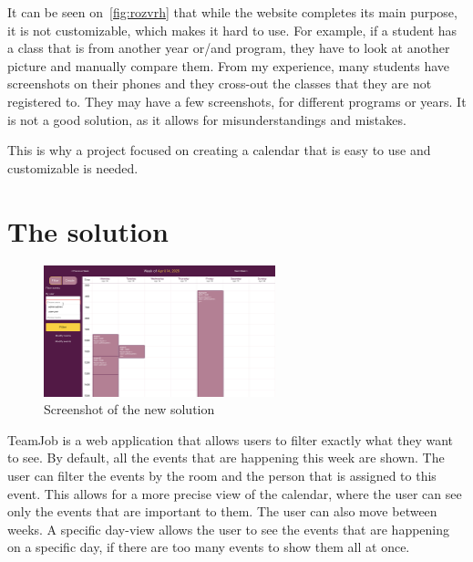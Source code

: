 It can be seen on~\ref{fig:rozvrh} that while the website completes its main purpose, it is not customizable, which makes it hard to use.
For example, if a student has a class that is from another year or/and program, they have to look at another picture and manually compare them.
From my experience, many students have screenshots on their phones and they cross-out the classes that they are not registered to.
They may have a few screenshots, for different programs or years.
It is not a good solution, as it allows for misunderstandings and mistakes.

This is why a project focused on creating a calendar that is easy to use and customizable is needed.
\section{The solution}\label{sec:the-solution}
\begin{figure}[h]
  \centering
  \includegraphics[width=0.6\textwidth]{TeamJob}
  \caption{Screenshot of the new solution}
  \label{fig:TeamJob}
\end{figure}
TeamJob is a web application that allows users to filter exactly what they want to see.
By default, all the events that are happening this week are shown.
The user can filter the events by the room and the person that is assigned to this event.
This allows for a more precise view of the calendar, where the user can see only the events that are important to them.
The user can also move between weeks.
A specific day-view allows the user to see the events that are happening on a specific day, if there are too many events to show them all at once.

